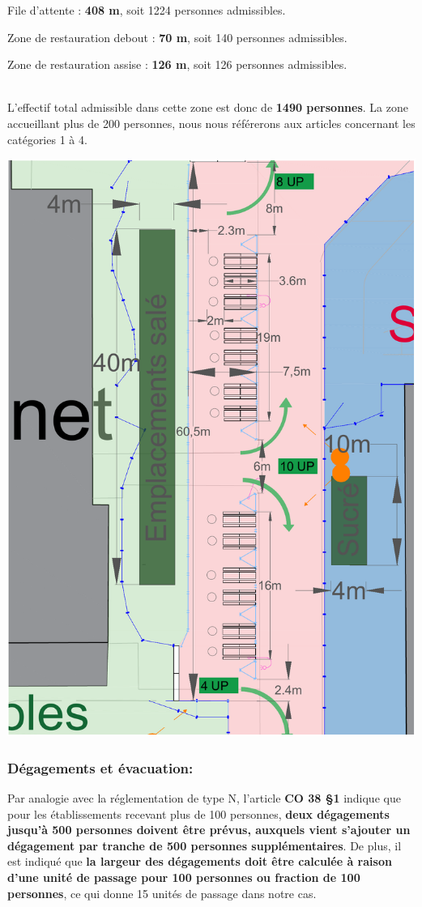 \documentclass[hidelinks, paper=a4, fontsize=13pt]{report}
\begin{document}
\begin{list}{•}{}
	\item File d'attente : \textbf{408 m}, soit 1224 personnes admissibles.
	\item Zone de restauration debout : \textbf{70 m}, soit 140 personnes admissibles.
	\item Zone de restauration assise : \textbf{126 m}, soit 126 personnes admissibles.
\end{list} \mbox{}\\

L'effectif total admissible dans cette zone est donc de \textbf{1490 personnes}. La zone accueillant plus de 200 personnes, nous nous référerons aux articles concernant les catégories 1 à 4. \\

\begin{center}
	\includegraphics[width=.8\textwidth,keepaspectratio]{Exports/Plan_24h_45eme-Espace_Resto_Cotes}
\end{center}

\subsubsection{Dégagements et évacuation:}
Par analogie avec la réglementation de type N, l’article \textbf{CO 38 §1} indique que pour les établissements recevant plus de 100 personnes, \textbf{deux dégagements jusqu’à 500 personnes doivent être prévus, auxquels vient s'ajouter un dégagement par tranche de 500 personnes supplémentaires}. De plus, il est indiqué que \textbf{la largeur des dégagements doit être calculée à raison d'une unité de passage pour 100 personnes ou fraction de 100 personnes}, ce qui donne 15 unités de passage dans notre cas. \\
\end{document}
